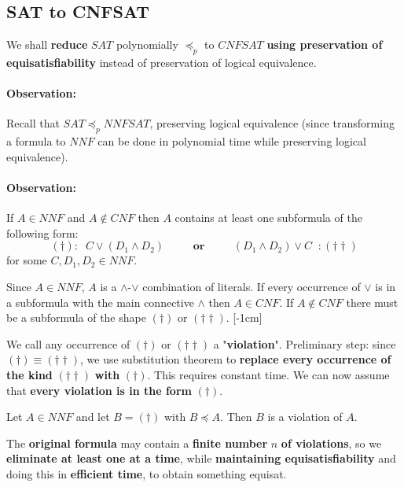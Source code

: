 	\vspace{-0.75cm}

	\subsection{SAT to CNFSAT}
	We shall \textbf{reduce} $SAT$ polynomially $\preceq_p$ to $CNFSAT$ \textbf{using preservation of equisatisfiability} instead of preservation of logical equivalence.

	\paragraph{Observation:} Recall that $SAT \preceq_p NNFSAT$, preserving logical equivalence (since transforming a formula to $NNF$ can be done in polynomial time while preserving logical equivalence).

	\paragraph{Observation:} If $A \in NNF$ and $A \notin CNF$ then $A$ contains at least one subformula of the following form:
	$$ (\dag): \;\; C \vee (D_1 \wedge D_2) \; \qquad \textbf{ or } \; \qquad  (D_1 \wedge D_2) \vee C \;\; :(\dag \dag) $$
	for some $C, D_1, D_2 \in NNF$.

	Since $A \in NNF$, $A$ is a $\wedge$-$\vee$ combination of literals. If every occurrence of $\vee$ is in a subformula with the main connective $\wedge$ then $A \in CNF$. If $A \notin CNF$ there must be a subformula of the shape $(\dag)$ or $(\dag \dag)$. [-1cm]

	We call any occurrence of $(\dag)$ or $(\dag \dag)$ a "\textbf{violation}". Preliminary step: since $(\dag) \equiv (\dag \dag)$, we use substitution theorem to \textbf{replace every occurrence of the kind} $(\dag \dag)$ \textbf{with} $(\dag)$. This requires constant time. We can now assume that \textbf{every violation is in the form} $(\dag)$.

	Let $A \in NNF$ and let $B = (\dag)$ with $B \preceq A$. Then $B$ is a violation of $A$.

	The \textbf{original formula} may contain a \textbf{finite number} $n$ \textbf{of violations}, so we \textbf{eliminate at least one at a time}, while \textbf{maintaining equisatisfiability} and doing this in \textbf{efficient time}, to obtain something equisat.\\

